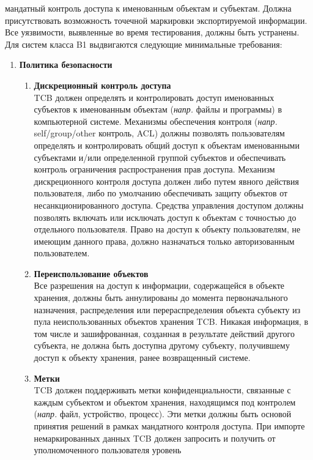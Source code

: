 \begin{enumerate}
\begin{enumerate}
		мандатный контроль доступа к именованным объектам и субъектам. Должна присутствовать возможность точечной маркировки экспортируемой информации. Все уязвимости, выявленные во время тестирования,
		должны быть устранены. Для систем класса B1 выдвигаются следующие минимальные требования:
        \begin{enumerate}
            \item{\textbf{Политика безопасности}}
            \begin{enumerate}
                \item{\textbf{Дискреционный контроль доступа}}\\
                TCB должен определять и контролировать доступ именованных субъектов к именованным объектам (\textit{напр.} файлы и программы) в компьютерной системе. Механизмы обеспечения контроля
                (\textit{напр.} self/group/other контроль, ACL) должны позволять пользователям определять и контролировать общий доступ к объектам именованными субъектами и/или определенной группой
                субъектов и обеспечивать контроль ограничения распространения прав доступа. Механизм дискреционного контроля доступа должен либо путем явного действия пользователя, либо по умолчанию
                обеспечивать защиту объектов от несанкционированного доступа. Средства управления доступом должны позволять включать или исключать доступ к объектам с точностью до отдельного
                пользователя. Право на доступ к объекту пользователям, не имеющим данного права, должно назначаться только авторизованным пользователем.
                \item{\textbf{Переиспользование объектов}}\\
                Все разрешения на доступ к информации, содержащейся в объекте хранения, должны быть аннулированы до момента первоначального назначения, распределения или перераспределения объекта
                субъекту из пула неиспользованных объектов хранения TCB. Никакая информация, в том числе и зашифрованная, созданная в результате действий другого субъекта, не должна быть доступна
                другому субъекту, получившему доступ к объекту хранения, ранее возвращенный системе.
                \item{\textbf{Метки}}\\
                TCB должен поддерживать метки конфиденциальности, связанные с каждым субъектом и объектом хранения, находящимся под контролем (\textit{напр.} файл, устройство, процесс). Эти метки должны
                быть основой принятия решений в рамках мандатного контроля доступа. При импорте немаркированных данных TCB должен запросить и получить от уполномоченного пользователя уровень

\end{enumerate}
\end{enumerate}
\end{enumerate}
\end{enumerate}
